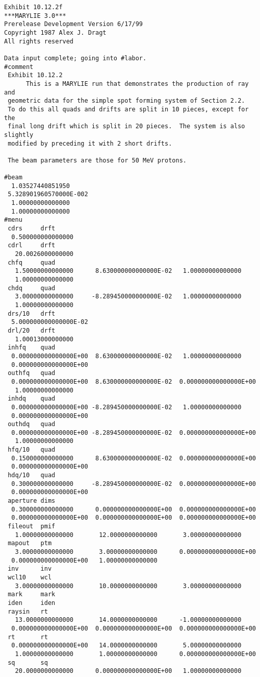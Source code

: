 \begin{footnotesize}
\begin{verbatim}
Exhibit 10.12.2f
***MARYLIE 3.0***
Prerelease Development Version 6/17/99
Copyright 1987 Alex J. Dragt
All rights reserved

Data input complete; going into #labor.
#comment
 Exhibit 10.12.2
      This is a MARYLIE run that demonstrates the production of ray and
 geometric data for the simple spot forming system of Section 2.2.
 To do this all quads and drifts are split in 10 pieces, except for the
 final long drift which is split in 20 pieces.  The system is also slightly
 modified by preceding it with 2 short drifts.

 The beam parameters are those for 50 MeV protons.

#beam
  1.03527440851950
 5.328901960570000E-002
  1.00000000000000
  1.00000000000000
#menu
 cdrs     drft
  0.500000000000000
 cdrl     drft
   20.0026000000000
 chfq     quad
   1.50000000000000      8.630000000000000E-02   1.00000000000000
   1.00000000000000
 chdq     quad
   3.00000000000000     -8.289450000000000E-02   1.00000000000000
   1.00000000000000
 drs/10   drft
  5.000000000000000E-02
 drl/20   drft
   1.00013000000000
 inhfq    quad
  0.000000000000000E+00  8.630000000000000E-02   1.00000000000000
  0.000000000000000E+00
 outhfq   quad
  0.000000000000000E+00  8.630000000000000E-02  0.000000000000000E+00
   1.00000000000000
 inhdq    quad
  0.000000000000000E+00 -8.289450000000000E-02   1.00000000000000
  0.000000000000000E+00
 outhdq   quad
  0.000000000000000E+00 -8.289450000000000E-02  0.000000000000000E+00
   1.00000000000000
 hfq/10   quad
  0.150000000000000      8.630000000000000E-02  0.000000000000000E+00
  0.000000000000000E+00
 hdq/10   quad
  0.300000000000000     -8.289450000000000E-02  0.000000000000000E+00
  0.000000000000000E+00
 aperture dims
  0.300000000000000      0.000000000000000E+00  0.000000000000000E+00
  0.000000000000000E+00  0.000000000000000E+00  0.000000000000000E+00
 fileout  pmif
   1.00000000000000       12.0000000000000       3.00000000000000
 mapout   ptm
   3.00000000000000       3.00000000000000      0.000000000000000E+00
  0.000000000000000E+00   1.00000000000000
 inv      inv
 wcl10    wcl
   3.00000000000000       10.0000000000000       3.00000000000000
 mark     mark
 iden     iden
 raysin   rt
   13.0000000000000       14.0000000000000      -1.00000000000000
  0.000000000000000E+00  0.000000000000000E+00  0.000000000000000E+00
 rt       rt
  0.000000000000000E+00   14.0000000000000       5.00000000000000
   1.00000000000000       1.00000000000000      0.000000000000000E+00
 sq       sq
   20.0000000000000      0.000000000000000E+00   1.00000000000000

\end{verbatim}
\end{footnotesize}
